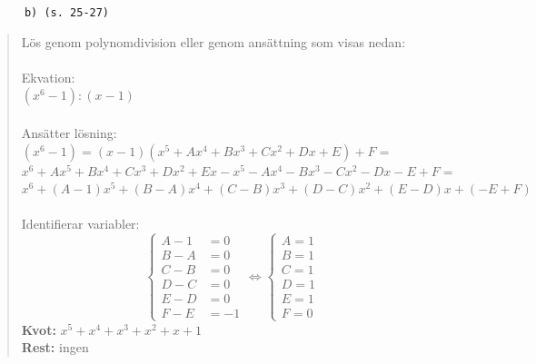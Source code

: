 \documentclass[a4paper]{article}
\newcommand{\tskcol}[1]{\textcolor{tskcol}{#1}}
\begin{document}
	\texttt{\tskcol{~~~~~~b) (s. 25-27)}}
	\begin{quotation}
		\noindent
		Lös genom polynomdivision eller genom ansättning som visas nedan: \\ \\
		Ekvation: \\
		$(x^6-1):(x-1)$ \\ \\
		Ansätter lösning: \\
		$(x^6-1)=(x-1)(x^5+Ax^4+Bx^3+Cx^2+Dx+E)+F=$ \\
		$x^6+Ax^5+Bx^4+Cx^3+Dx^2+Ex-x^5-Ax^4-Bx^3-Cx^2-Dx-E+F=$ \\
		$x^6+(A-1)x^5+(B-A)x^4+(C-B)x^3+(D-C)x^2+(E-D)x+(-E+F)$ \\ \\
		Identifierar variabler:\\
		\[\begin{cases} 
		A-1&=0 \\ 
		B-A&=0 \\ 
		C-B&=0 \\
		D-C&=0 \\
		E-D&=0 \\
		F-E&=-1
		\end{cases}
		\Leftrightarrow
		\begin{cases} 
		A=1 \\ 
		B=1 \\
		C=1 \\
		D=1 \\
		E=1 \\
		F=0
		\end{cases}\]
		\textbf{Kvot:} $x^5+x^4+x^3+x^2+x+1$ \\
		\textbf{Rest:} ingen
	\end{quotation}
	
\end{document}
